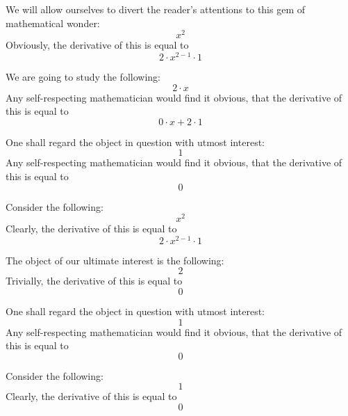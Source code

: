 \documentclass{article}
\begin{document}
We will allow ourselves to divert the reader's attentions to this gem of mathematical wonder:
\begin{equation}
x ^{2 } 
\end{equation}
Obviously, the derivative of this is equal to
\begin{equation}
2 \cdot x ^{2 - 1 } \cdot 1 
\end{equation}

We are going to study the following:
\begin{equation}
2 \cdot x 
\end{equation}
Any self-respecting mathematician would find it obvious, that the derivative of this is equal to
\begin{equation}
0 \cdot x + 2 \cdot 1 
\end{equation}

One shall regard the object in question with utmost interest:
\begin{equation}
1 
\end{equation}
Any self-respecting mathematician would find it obvious, that the derivative of this is equal to
\begin{equation}
0 
\end{equation}

Consider the following:
\begin{equation}
x ^{2 } 
\end{equation}
Clearly, the derivative of this is equal to
\begin{equation}
2 \cdot x ^{2 - 1 } \cdot 1 
\end{equation}

The object of our ultimate interest is the following:
\begin{equation}
2 
\end{equation}
Trivially, the derivative of this is equal to
\begin{equation}
0 
\end{equation}

One shall regard the object in question with utmost interest:
\begin{equation}
1 
\end{equation}
Any self-respecting mathematician would find it obvious, that the derivative of this is equal to
\begin{equation}
0 
\end{equation}

Consider the following:
\begin{equation}
1 
\end{equation}
Clearly, the derivative of this is equal to
\begin{equation}
0 
\end{equation}
\end{document}

